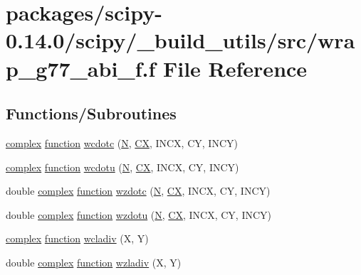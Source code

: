 \hypertarget{wrap__g77__abi__f_8f}{}\section{packages/scipy-\/0.14.0/scipy/\+\_\+build\+\_\+utils/src/wrap\+\_\+g77\+\_\+abi\+\_\+f.f File Reference}
\label{wrap__g77__abi__f_8f}
\subsection*{Functions/\+Subroutines}
\begin{DoxyCompactItemize}
\item 
\hyperlink{structcomplex}{complex} \hyperlink{afunc_8m_a7b5e596df91eadea6c537c0825e894a7}{function} \hyperlink{wrap__g77__abi__f_8f_a010a6db968e22d44533fdc5034326502}{wcdotc} (\hyperlink{polmisc_8c_a0240ac851181b84ac374872dc5434ee4}{N}, \hyperlink{scsum1_8c_a5a76da95c549c41790389a76e12fdcb5}{C\+X}, I\+N\+C\+X, C\+Y, I\+N\+C\+Y)
\item 
\hyperlink{structcomplex}{complex} \hyperlink{afunc_8m_a7b5e596df91eadea6c537c0825e894a7}{function} \hyperlink{wrap__g77__abi__f_8f_a455b449b4405f656fd200cbe5a3c8c79}{wcdotu} (\hyperlink{polmisc_8c_a0240ac851181b84ac374872dc5434ee4}{N}, \hyperlink{scsum1_8c_a5a76da95c549c41790389a76e12fdcb5}{C\+X}, I\+N\+C\+X, C\+Y, I\+N\+C\+Y)
\item 
double \hyperlink{structcomplex}{complex} \hyperlink{afunc_8m_a7b5e596df91eadea6c537c0825e894a7}{function} \hyperlink{wrap__g77__abi__f_8f_a56e918d321922abf047ad523b00d5658}{wzdotc} (\hyperlink{polmisc_8c_a0240ac851181b84ac374872dc5434ee4}{N}, \hyperlink{scsum1_8c_a5a76da95c549c41790389a76e12fdcb5}{C\+X}, I\+N\+C\+X, C\+Y, I\+N\+C\+Y)
\item 
double \hyperlink{structcomplex}{complex} \hyperlink{afunc_8m_a7b5e596df91eadea6c537c0825e894a7}{function} \hyperlink{wrap__g77__abi__f_8f_a4fab42819125488dda665c3f31d8dcad}{wzdotu} (\hyperlink{polmisc_8c_a0240ac851181b84ac374872dc5434ee4}{N}, \hyperlink{scsum1_8c_a5a76da95c549c41790389a76e12fdcb5}{C\+X}, I\+N\+C\+X, C\+Y, I\+N\+C\+Y)
\item 
\hyperlink{structcomplex}{complex} \hyperlink{afunc_8m_a7b5e596df91eadea6c537c0825e894a7}{function} \hyperlink{wrap__g77__abi__f_8f_ad90ecce5efe253efbf605ccc0f4c80bd}{wcladiv} (X, Y)
\item 
double \hyperlink{structcomplex}{complex} \hyperlink{afunc_8m_a7b5e596df91eadea6c537c0825e894a7}{function} \hyperlink{wrap__g77__abi__f_8f_a87da858fbb51b8d8f5d8c942dbddaf38}{wzladiv} (X, Y)
\end{DoxyCompactItemize}


